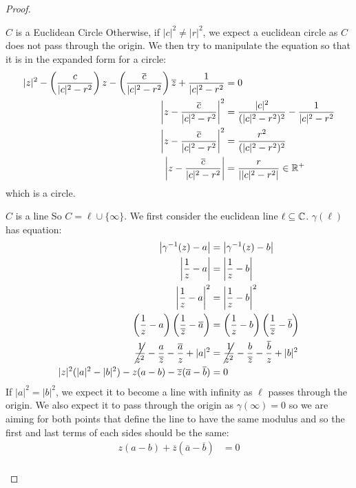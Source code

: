 \documentclass[../main.tex]{subfiles}
\begin{document}
\begin{proof}
\begin{proofcases}
\begin{case}{$C$ is a Euclidean Circle}
      Otherwise, if $|c|^2 \neq |r|^2$, we expect a euclidean circle as $C$ does not pass through the origin.
      We then try to manipulate the equation so that it is in the expanded form for a circle:
      \begin{align*}
        |z|^2 - \left(\frac{c}{|c|^2 - r^2}\right) z - \left(\frac{\overline{c}}{|c|^2 - r^2}\right)\overline{z} + \frac{1}{|c|^2 - r^2} &= 0 \\
        \left\lvert z - \frac{\overline{c}}{|c|^2 - r^2} \right\rvert^2 &= \frac{|c|^2}{(|c|^2 - r^2)^2} - \frac{1}{|c|^2 - r^2} \\
        \left\lvert z - \frac{\overline{c}}{|c|^2 - r^2} \right\rvert^2 &= \frac{r^2}{(|c|^2 - r^2)^2} \\
        \left\lvert z - \frac{\overline{c}}{|c|^2 - r^2} \right\rvert &= \frac{r}{\left\lvert |c|^2 - r^2 \right\rvert} \in \mathbb{R}^{+}
      \end{align*}
      which is a circle.
    \end{case}
    \begin{case}{$C$ is a line}
      So $C = \ell \cup \{\infty\}$.
      We first consider the euclidean line $\ell \subseteq \mathbb{C}$.
      $\gamma(\ell)$ has equation:
      \begin{align*}
        \left\lvert \gamma^{-1}(z) - a \right\rvert &= \left\lvert \gamma^{-1}(z) - b \right\rvert \\
        \left\lvert \frac{1}{z} - a \right\rvert &= \left\lvert \frac{1}{z} - b \right\rvert \\
        \left\lvert \frac{1}{z} - a \right\rvert^2 &= \left\lvert \frac{1}{z} - b \right\rvert^2 \\
        \left(\frac{1}{z} - a\right)\left(\frac{1}{\overline{z}} - \overline{a}\right) &= \left(\frac{1}{z} - b\right)\left(\frac{1}{\overline{z}} - \overline{b}\right) \\
        \cancel{\frac{1}{z^2}} - \frac{a}{\overline{z}} - \frac{\overline{a}}{z} + |a|^2 &= \cancel{\frac{1}{z^2}} - \frac{b}{\overline{z}} - \frac{\overline{b}}{z} + |b|^2 \\
        |z|^2(|a|^2 - |b|^2) - z(a - b) - \overline{z}(\overline{a} - \overline{b}) &= 0
      \end{align*}
      If $|a|^2 = |b|^2$, we expect it to become a line with infinity as $\ell$ passes through the origin.
      We also expect it to pass through the origin as $\gamma(\infty) = 0$ so we are aiming for both points that define the line to have the same modulus and so the first and last terms of each sides should be the same:
      \begin{align*}
        z(a - b) + \overline{z}(\overline{a} - \overline{b}) &= 0 \\

\end{align*}
\end{case}
\end{proofcases}
\end{proof}
\end{document}
